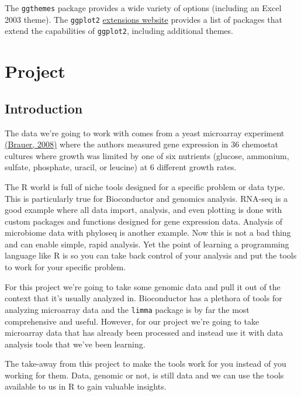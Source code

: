 \documentclass[]{book}
\begin{document}
The \texttt{ggthemes} package provides a wide variety of options (including an Excel 2003 theme). The \texttt{ggplot2} \href{https://www.ggplot2-exts.org}{extensions website} provides a list of packages that extend the capabilities of \texttt{ggplot2}, including additional themes.

\hypertarget{project}{%
\chapter{Project}\label{project}}

\hypertarget{introduction-1}{%
\section*{Introduction}\label{introduction-1}}

The data we're going to work with comes from a yeast microarray experiment \href{http://www.molbiolcell.org/content/19/1/352.abstract}{(Brauer, 2008)} where the authors measured gene expression in 36 chemostat cultures where growth was limited by one of six nutrients (glucose, ammonium, sulfate, phosphate, uracil, or leucine) at 6 different growth rates.

The R world is full of niche tools designed for a specific problem or data type. This is particularly true for Bioconductor and genomics analysis. RNA-seq is a good example where all data import, analysis, and even plotting is done with custom packages and functions designed for gene expression data. Analysis of microbiome data with phyloseq is another example. Now this is not a bad thing and can enable simple, rapid analysis. Yet the point of learning a programming language like R is so you can take back control of your analysis and put the tools to work for your specific problem.

For this project we're going to take some genomic data and pull it out of the context that it's usually analyzed in. Bioconductor has a plethora of tools for analyzing microarray data and the \texttt{limma} package is by far the most comprehensive and useful. However, for our project we're going to take microarray data that has already been processed and instead use it with data analysis tools that we've been learning.

The take-away from this project to make the tools work for you instead of you working for them. Data, genomic or not, is still data and we can use the tools available to us in R to gain valuable insights.
\end{document}
